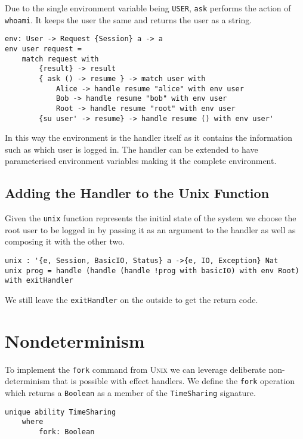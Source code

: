\documentclass[logo,bsc,singlespacing,parskip]{infthesis}
\begin{document}
Due to the single environment variable being \texttt{USER}, \texttt{ask}
performs the action of \texttt{whoami}. It keeps the user the same and returns
the user as a string.

\begin{lstlisting}[language=unison]
env: User -> Request {Session} a -> a
env user request = 
    match request with
        {result} -> result
        { ask () -> resume } -> match user with 
            Alice -> handle resume "alice" with env user
            Bob -> handle resume "bob" with env user
            Root -> handle resume "root" with env user
        {su user' -> resume} -> handle resume () with env user'
\end{lstlisting}

In this way the environment is the handler itself as it contains the
information such as which user is logged in. The handler can be extended to
have parameterised environment variables making it the complete environment.

\subsection{Adding the Handler to the Unix Function}

Given the \texttt{unix} function represents the initial state of the system we
choose the root user to be logged in by passing it as an argument to the
handler as well as composing it with the other two.

\begin{lstlisting}[language=unison]
unix : '{e, Session, BasicIO, Status} a ->{e, IO, Exception} Nat
unix prog = handle (handle (handle !prog with basicIO) with env Root) with exitHandler
\end{lstlisting}

We still leave the \texttt{exitHandler} on the outside to get the return code.

\section{Nondeterminism}

To implement the \texttt{fork} command from \textsc{Unix} we can leverage
deliberate non-determinism that is possible with effect handlers. We define the
\texttt{fork} operation which returns a \texttt{Boolean} as a member of the
\texttt{TimeSharing} signature.

\begin{lstlisting}[language=unison]
unique ability TimeSharing
    where
        fork: Boolean
\end{lstlisting}
\end{document}
